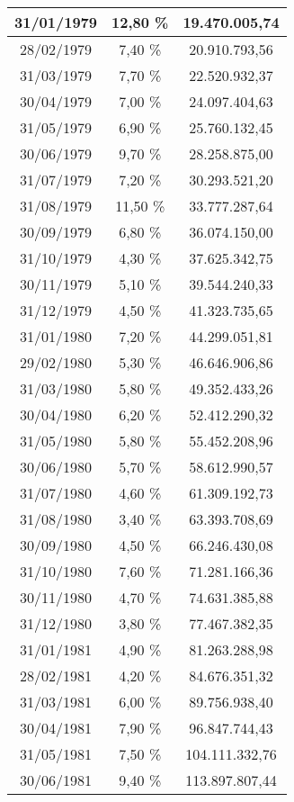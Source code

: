 \begin{center}
\begin{longtable}{|c|c|c|}
31/01/1979 & 12,80 \% & 19.470.005,74  \\ \hline
28/02/1979 & 7,40 \% & 20.910.793,56  \\ \hline
31/03/1979 & 7,70 \% & 22.520.932,37  \\ \hline
30/04/1979 & 7,00 \% & 24.097.404,63  \\ \hline
31/05/1979 & 6,90 \% & 25.760.132,45  \\ \hline
30/06/1979 & 9,70 \% & 28.258.875,00  \\ \hline
31/07/1979 & 7,20 \% & 30.293.521,20  \\ \hline
31/08/1979 & 11,50 \% & 33.777.287,64  \\ \hline
30/09/1979 & 6,80 \% & 36.074.150,00  \\ \hline
31/10/1979 & 4,30 \% & 37.625.342,75  \\ \hline
30/11/1979 & 5,10 \% & 39.544.240,33  \\ \hline
31/12/1979 & 4,50 \% & 41.323.735,65  \\ \hline
31/01/1980 & 7,20 \% & 44.299.051,81  \\ \hline
29/02/1980 & 5,30 \% & 46.646.906,86  \\ \hline
31/03/1980 & 5,80 \% & 49.352.433,26  \\ \hline
30/04/1980 & 6,20 \% & 52.412.290,32  \\ \hline
31/05/1980 & 5,80 \% & 55.452.208,96  \\ \hline
30/06/1980 & 5,70 \% & 58.612.990,57  \\ \hline
31/07/1980 & 4,60 \% & 61.309.192,73  \\ \hline
31/08/1980 & 3,40 \% & 63.393.708,69  \\ \hline
30/09/1980 & 4,50 \% & 66.246.430,08  \\ \hline
31/10/1980 & 7,60 \% & 71.281.166,36  \\ \hline
30/11/1980 & 4,70 \% & 74.631.385,88  \\ \hline
31/12/1980 & 3,80 \% & 77.467.382,35  \\ \hline
31/01/1981 & 4,90 \% & 81.263.288,98  \\ \hline
28/02/1981 & 4,20 \% & 84.676.351,32  \\ \hline
31/03/1981 & 6,00 \% & 89.756.938,40  \\ \hline
30/04/1981 & 7,90 \% & 96.847.744,43  \\ \hline
31/05/1981 & 7,50 \% & 104.111.332,76  \\ \hline
30/06/1981 & 9,40 \% & 113.897.807,44  \\ \hline

\end{longtable}
\end{center}
